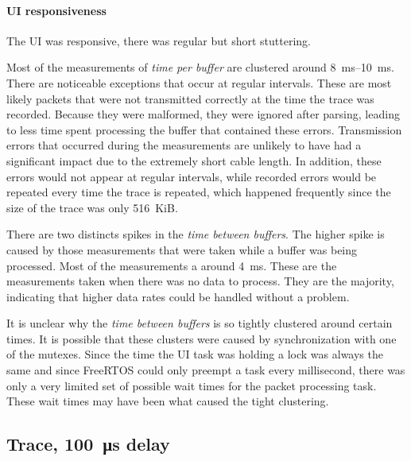 \paragraph{UI responsiveness}

The UI was responsive, there was regular but short stuttering.
\bigbreak

Most of the measurements of \textit{time per buffer} are clustered around \SIrange{8}{10}{\milli\second}.
There are noticeable exceptions that occur at regular intervals. These are most likely packets that
were not transmitted correctly at the time the trace was recorded. Because they were malformed, they
were ignored after parsing, leading to less time spent processing the buffer that contained these
errors. Transmission errors that occurred during the measurements are unlikely to have had a significant
impact due to the extremely short cable length. In addition, these errors would not appear at regular
intervals, while recorded errors would be repeated every time the trace is repeated, which happened
frequently since the size of the trace was only \SI{516}{KiB}.

There are two distincts spikes in the \textit{time between buffers}. The higher spike is caused by
those measurements that were taken while a buffer was being processed. Most of the measurements a
around \SI{4}{\milli\second}. These are the measurements taken when there was no data to process.
They are the majority, indicating that higher data rates could be handled without a problem.

It is unclear why the \textit{time between buffers} is so tightly clustered around certain times.
It is possible that these clusters were caused by synchronization with one of the mutexes. Since the
time the UI task was holding a lock was always the same and since FreeRTOS could only preempt a task
every millisecond, there was only a very limited set of possible wait times for the packet processing
task. These wait times may have been what caused the tight clustering.

\subsection{Trace, \SI{100}{\micro\second} delay}
\label{evaluation/results/trace-100us-delay}

